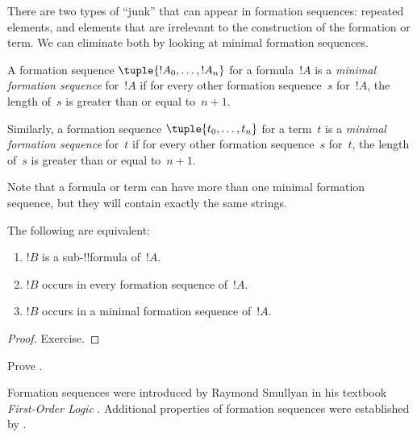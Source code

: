 There are two types of ``junk'' that can appear in formation
sequences: repeated elements, and elements that are irrelevant
to the construction of the formation or term. We can eliminate
both by looking at minimal formation sequences.

\begin{defn}
A formation sequence $\tuple{!A_0, \ldots, !A_n}$ for a
formula~$!A$ is a \emph{minimal formation sequence} for~$!A$
if for every other formation sequence~$s$ for~$!A$,
the length of~$s$ is greater than or equal to~$n+1$.

Similarly, a formation sequence $\tuple{t_0, \ldots, t_n}$
for a term~$t$ is a \emph{minimal formation sequence}
for~$t$ if for every other formation sequence~$s$ for~$t$,
the length of~$s$ is greater than or equal to~$n+1$.
\end{defn}

Note that a formula or term can have more than one minimal
formation sequence, but they will contain exactly the same
strings.

\begin{prop}
The following are equivalent:
\begin{enumerate}
    \item $!B$ is a sub-!!{formula} of~$!A$.
    \item $!B$ occurs in every formation sequence of~$!A$.
    \item $!B$ occurs in a minimal formation sequence of~$!A$.
\end{enumerate}
\end{prop}

\begin{proof}
Exercise.
\end{proof}

\begin{prob}
Prove .
\end{prob}

\begin{history}
Formation sequences were introduced by Raymond Smullyan in his
textbook \emph{First-Order Logic} \citep{Smullyan1968}.
Additional properties of formation sequences were established by
\citet{Zuckerman1973}.
\end{history}







